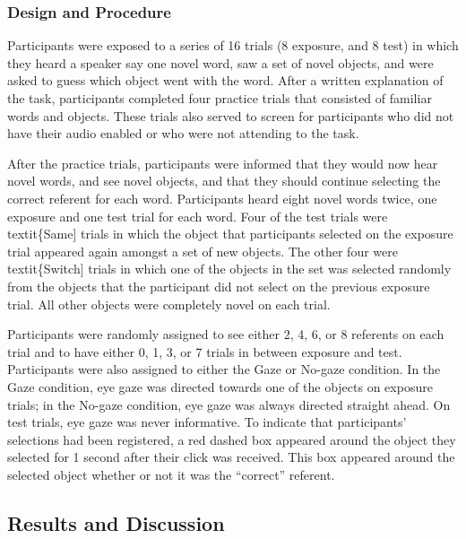 \documentclass[12pt,]{article}
\begin{document}
\subsubsection{Design and Procedure}\label{design-and-procedure}

Participants were exposed to a series of 16 trials (8 exposure, and 8
test) in which they heard a speaker say one novel word, saw a set of
novel objects, and were asked to guess which object went with the word.
After a written explanation of the task, participants completed four
practice trials that consisted of familiar words and objects. These
trials also served to screen for participants who did not have their
audio enabled or who were not attending to the task.

After the practice trials, participants were informed that they would
now hear novel words, and see novel objects, and that they should
continue selecting the correct referent for each word. Participants
heard eight novel words twice, one exposure and one test trial for each
word. Four of the test trials were textit\{Same{]} trials in which the
object that participants selected on the exposure trial appeared again
amongst a set of new objects. The other four were textit\{Switch{]}
trials in which one of the objects in the set was selected randomly from
the objects that the participant did not select on the previous exposure
trial. All other objects were completely novel on each trial.

Participants were randomly assigned to see either 2, 4, 6, or 8
referents on each trial and to have either 0, 1, 3, or 7 trials in
between exposure and test. Participants were also assigned to either the
Gaze or No-gaze condition. In the Gaze condition, eye gaze was directed
towards one of the objects on exposure trials; in the No-gaze condition,
eye gaze was always directed straight ahead. On test trials, eye gaze
was never informative. To indicate that participants' selections had
been registered, a red dashed box appeared around the object they
selected for 1 second after their click was received. This box appeared
around the selected object whether or not it was the ``correct''
referent.

\subsection{Results and Discussion}\label{results-and-discussion}
\end{document}
